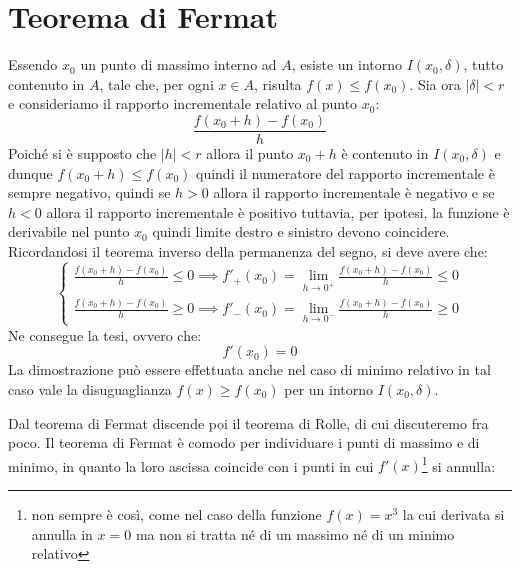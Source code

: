 \documentclass{report}
\begin{document}
\section{Teorema di Fermat}
\begin{myproof}
Essendo $x_0$ un punto di massimo interno ad $A$, esiste un intorno $I(x_0, \delta)$, tutto contenuto in $A$, tale che, per ogni $x \in A$, risulta $f(x)\leq f(x_0)$.
Sia ora $|\delta|<r$ e consideriamo il rapporto incrementale relativo al punto $x_0$:
$$
\frac{f(x_0 + h)-f(x_0)}{h}
$$
Poiché si è supposto che $|h| < r$ allora il punto $x_0 + h$ è contenuto in $I(x_0, \delta)$ e dunque $f(x_0 + h) \leq f(x_0)$ quindi il numeratore del rapporto incrementale è sempre negativo, quindi se $h > 0$ allora il rapporto incrementale è negativo e se $h < 0$ allora il rapporto incrementale è positivo tuttavia, per ipotesi, la funzione è derivabile nel punto $x_0$ quindi limite destro e sinistro devono coincidere. Ricordandosi il teorema inverso della permanenza del segno, si deve avere che:
\begin{equation}	
	\begin{cases}
		\frac{f(x_0 + h) - f(x_0)}{h} \leq 0 \implies f'_{+}(x_0) = \lim\limits_{h \to 0^{+}} \frac{f(x_0 + h) - f(x_0)}{h} \leq 0 \\
\frac{f(x_0 + h) - f(x_0)}{h} \geq 0 \implies f'_{-}(x_0) = \lim\limits_{h \to 0^{-}} \frac{f(x_0 + h) - f(x_0)}{h} \geq 0

	\end{cases}
\end{equation}
Ne consegue la tesi, ovvero che:
$$
	f'(x_0) = 0
$$
La dimostrazione può essere effettuata anche nel caso di minimo relativo in tal caso vale la disuguaglianza $f(x)\geq f(x_0)$ per un intorno $I(x_0, \delta)$.
\end{myproof}
\par\smallskip\noindent Dal teorema di Fermat discende poi il teorema di Rolle, di cui discuteremo fra poco. Il teorema di Fermat è comodo per individuare i punti di massimo e di minimo, in quanto la loro ascissa coincide con i punti in cui $f'(x)$\footnote{non sempre è così, come nel caso della funzione $f(x)=x^3$ la cui derivata si annulla in $x=0$ ma non si tratta né di un massimo né di un minimo relativo} si annulla:
\end{document}

